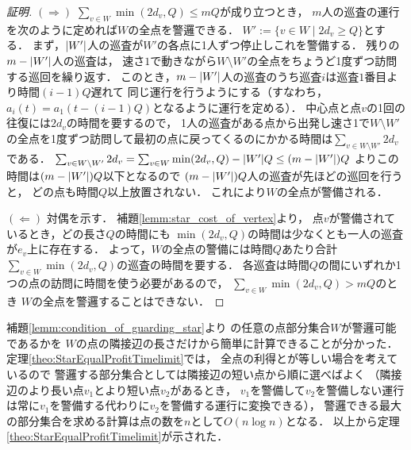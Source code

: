 \begin{proof}[証明]
$(\Rightarrow)$
$\sum_{v \in W} \min(2d_v, Q) \leq mQ$が成り立つとき，
$m$人の巡査の運行を次のように定めれば$W$の全点を警邏できる．
$W' := \{ v \in W \mid 2d_v \geq Q \}$とする．
まず，$\lvert{W'}\rvert$人の巡査が$W'$の各点に1人ずつ停止しこれを警備する．
残りの$m - \lvert{W'}\rvert$人の巡査は，
速さ$1$で動きながら$W \setminus W'$の全点をちょうど1度ずつ訪問する巡回を繰り返す．
このとき，$m - \lvert{W'}\rvert$人の巡査のうち巡査$i$は巡査$1$番目より時間$(i - 1)Q$遅れて
同じ運行を行うようにする（すなわち，$a_i(t) = a_1(t - (i - 1)Q)$となるように運行を定める）．
中心点と点$v$の1回の往復には$2d_v$の時間を要するので，
1人の巡査がある点から出発し速さ1で$W \setminus W'$の全点を1度ずつ訪問して最初の点に戻ってくるのにかかる時間は$\sum_{v \in W \setminus W'} 2d_v$である．
$\sum_{v \in W \setminus W'} 2d_v
= \sum_{v \in W} \min(2d_v, Q) - |W'|Q
\leq (m - \lvert{W'}\rvert)Q$
よりこの時間は$(m - \lvert{W'}\rvert)Q$以下となるので
$(m - \lvert{W'}\rvert)Q$人の巡査が先ほどの巡回を行うと，
どの点も時間$Q$以上放置されない．
これにより$W$の全点が警備される．

$(\Leftarrow)$
対偶を示す．
補題\ref{lemm:star_cost_of_vertex}より，
点$v$が警備されているとき，どの長さ$Q$の時間にも
$\min(2d_v, Q)$の時間は少なくとも一人の巡査が$e_v$上に存在する．
よって，$W$の全点の警備には時間$Q$あたり合計$\sum_{v \in W} \min(2d_v, Q)$の巡査の時間を要する．
各巡査は時間$Q$の間にいずれか1つの点の訪問に時間を使う必要があるので，
$\sum_{v \in W} \min(2d_v, Q) > mQ$のとき
$W$の全点を警邏することはできない．
\end{proof}


補題\ref{lemm:condition_of_guarding_star}より
{\graphStar}の任意の点部分集合$W$が警邏可能であるかを
$W$の点の隣接辺の長さだけから簡単に計算できることが分かった．
定理\ref{theo:StarEqualProfitTimelimit}では，
全点の利得と{\maxIdletime}が等しい場合を考えているので
警邏する部分集合としては隣接辺の短い点から順に選べばよく
（隣接辺のより長い点$v_1$とより短い点$v_2$があるとき，
$v_1$を警備して$v_2$を警備しない運行は常に$v_1$を警備する代わりに$v_2$を警備する運行に変換できる），
警邏できる最大の部分集合を求める計算は点の数を$n$として$O(n \log n)$となる．
以上から定理\ref{theo:StarEqualProfitTimelimit}が示された．
